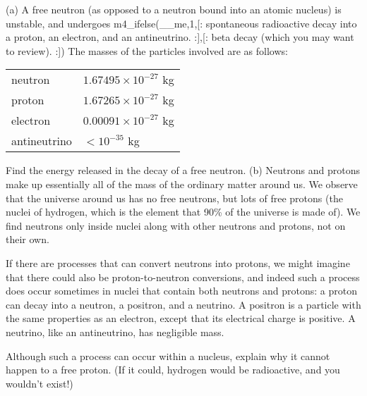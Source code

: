 (a) A free neutron (as opposed to a neutron bound into
an atomic nucleus) is unstable, and undergoes 
m4_ifelse(__me,1,[:%
spontaneous radioactive decay into a proton, an electron, and an antineutrino.
:],[:%
beta decay (which you may want to review).
:])%
The masses of the particles involved are as follows:

\qquad\begin{tabular}{ll}
        neutron                & $1.67495\times10^{-27}$  kg\\
        proton                & $1.67265\times10^{-27}$  kg\\
        electron        & $0.00091\times10^{-27}$  kg\\
        antineutrino        & $<10^{-35}$ kg\\
\end{tabular}

\noindent Find the energy released in the decay of a free neutron. \answercheck\hwendpart
(b) Neutrons and protons make up essentially all of the mass of the ordinary
matter around us. We observe that the universe around us has no free neutrons, but
lots of free protons
(the nuclei of hydrogen, which is the element that 90\% of the universe
is made of). We find neutrons only inside nuclei along with other neutrons and
protons, not on their own.

If there are processes that can convert neutrons into protons, we might imagine
that there could also be proton-to-neutron conversions, and indeed such a process
does occur sometimes in nuclei that contain both neutrons and protons:
a proton can decay into a
neutron, a positron, and a neutrino. A positron is a particle with the same
properties as an electron, except that its electrical charge is positive.
A neutrino, like an antineutrino, has negligible mass.

Although such a process
can occur within a nucleus, explain why it cannot happen to
a free proton. (If it could, hydrogen would be radioactive, and you
wouldn't exist!)
